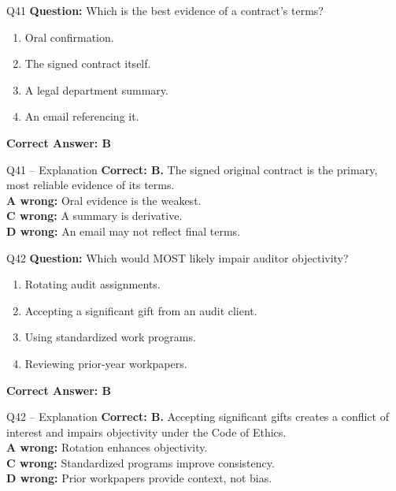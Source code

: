 \documentclass[aspectratio=169,10pt]{beamer}
\begin{document}
	\begin{frame}[t]{Q41}
		\small
		\textbf{Question:} Which is the best evidence of a contract's terms?
		\begin{enumerate}[label=\Alph*.,itemsep=1pt,topsep=2pt]
			\item Oral confirmation.
			\item The signed contract itself.
			\item A legal department summary.
			\item An email referencing it.
		\end{enumerate}
		\vspace{4pt}
		\textbf{Correct Answer: B}
	\end{frame}
	
	\begin{frame}[t]{Q41 -- Explanation}
		\small
		\textbf{Correct: B.} The signed original contract is the primary, most reliable evidence of its terms. \\[4pt]
		\textbf{A wrong:} Oral evidence is the weakest. \\[2pt]
		\textbf{C wrong:} A summary is derivative. \\[2pt]
		\textbf{D wrong:} An email may not reflect final terms.
	\end{frame}
	
	\begin{frame}[t]{Q42}
		\small
		\textbf{Question:} Which would MOST likely impair auditor objectivity?
		\begin{enumerate}[label=\Alph*.,itemsep=1pt,topsep=2pt]
			\item Rotating audit assignments.
			\item Accepting a significant gift from an audit client.
			\item Using standardized work programs.
			\item Reviewing prior-year workpapers.
		\end{enumerate}
		\vspace{4pt}
		\textbf{Correct Answer: B}
	\end{frame}
	
	\begin{frame}[t]{Q42 -- Explanation}
		\small
		\textbf{Correct: B.} Accepting significant gifts creates a conflict of interest and impairs objectivity under the Code of Ethics. \\[4pt]
		\textbf{A wrong:} Rotation enhances objectivity. \\[2pt]
		\textbf{C wrong:} Standardized programs improve consistency. \\[2pt]
		\textbf{D wrong:} Prior workpapers provide context, not bias.
	\end{frame}
	
\end{document}
